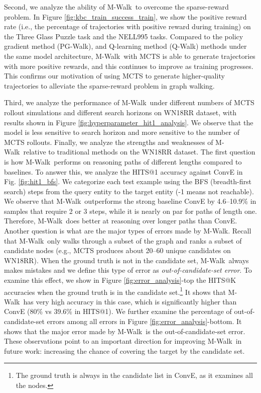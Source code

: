 \documentclass{article}
\newcommand{\modelname}{M-Walk}
\begin{document}
	
	Second, we analyze the ability of \modelname~to overcome the sparse-reward problem. In Figure \ref{fig:kbc_train_success_train}, we show the positive reward rate (i.e., the percentage of trajectories with positive reward during training) on the Three Glass Puzzle task and the NELL995 tasks. Compared to the policy gradient method (PG-Walk), and Q-learning method (Q-Walk) methods under the same model architecture, \modelname~with MCTS is able to generate trajectories with more positive rewards, and this continues to improve as training progresses. This confirms our motivation of using MCTS to generate higher-quality trajectories to alleviate the sparse-reward problem in graph walking. 


	Third, we analyze the performance of \modelname~under different numbers of MCTS rollout simulations and different search horizons on WN18RR dataset, with results shown in Figure \ref{fig:hyperparameter_hit1_analysis}. We observe that the model is less sensitive to search horizon and more sensitive to the number of MCTS rollouts. 
	Finally, we analyze the strengths and weaknesses of \modelname~relative to traditional methods on the WN18RR dataset. The first question is how \modelname~performs on reasoning paths of different lengths compared to baselines. To answer this, we analyze the HITS@1 accuracy against ConvE in Fig. \ref{fig:hit1_bfs}. We categorize each test example using the BFS (breadth-first search) steps from the query entity to the target entity (-1 means not reachable). We observe that \modelname~outperforms the strong baseline ConvE by 4.6--10.9\% in samples that require 2 or 3 steps, while it is nearly on par for paths of length one. Therefore, \modelname~does better at reasoning over longer paths than ConvE. Another question is what are the major types of errors made by \modelname. Recall that \modelname~only walks through a subset of the graph and ranks a subset of candidate nodes (e.g., MCTS produces about 20--60 unique candidates on WN18RR). When the ground truth is not in the candidate set, \modelname~always makes mistakes and we define this type of error as \emph{out-of-candidate-set error}. To examine this effect, we show in Figure \ref{fig:error_analysis}-top the HITS@K accuracies when the ground truth is in the candidate set.\footnote{The ground truth is always in the candidate list in ConvE, as it examines all the nodes.} It shows that \modelname~has very high accuracy in this case, which is significantly higher than ConvE (80\% vs 39.6\% in HITS@1). We further examine the percentage of out-of-candidate-set errors among all errors in Figure \ref{fig:error_analysis}-bottom. It shows that the major error made by \modelname~is the out-of-candidate-set error. These observations point to an important direction for improving \modelname~in future work: increasing the chance of covering the target by the candidate set.
    
\end{document}

